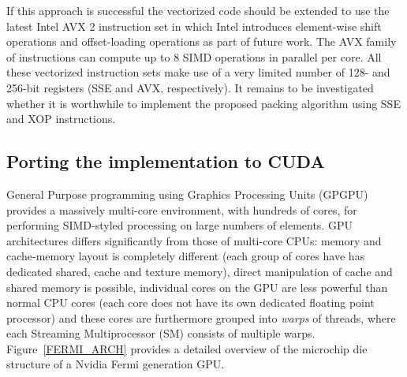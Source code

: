  If this approach is successful the vectorized code should be extended to use the latest Intel AVX 2 instruction set in which Intel introduces element-wise shift operations and offset-loading operations as part of 
 future work. The AVX family of instructions can compute up to 8 SIMD operations in parallel per core. All these vectorized instruction sets make use of a very limited number of 128- and 256-bit registers (SSE and 
 AVX, respectively). It remains to be investigated whether it is worthwhile to implement the proposed packing algorithm using SSE and XOP instructions.
\subsection{Porting the implementation to CUDA}
General Purpose programming using Graphics Processing Units (GPGPU) provides a massively multi-core environment, with hundreds of cores, for performing SIMD-styled 
processing on large numbers of elements. GPU architectures differs significantly from those of multi-core CPUs: memory and cache-memory layout is completely different (each group of cores have 
has dedicated shared, cache and texture memory), direct manipulation of cache and shared memory is possible, individual cores on the GPU are less powerful than normal CPU cores (each core does not have its own dedicated floating point 
processor) and these cores are furthermore grouped into \textit{warps} of threads, where each Streaming Multiprocessor (SM) consists of multiple warps. Figure~\ref{FERMI_ARCH} provides a detailed overview of the microchip die structure of a Nvidia Fermi generation GPU.

